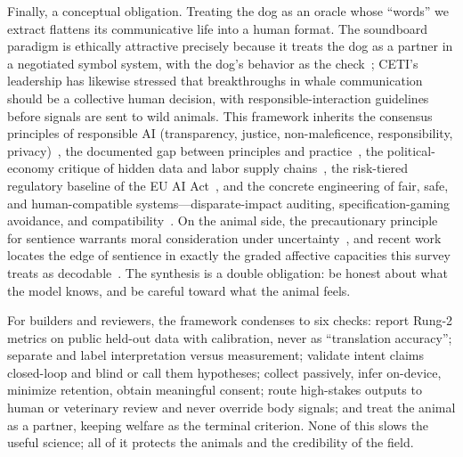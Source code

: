 Finally, a conceptual obligation. Treating the dog as an oracle whose
``words'' we extract flattens its communicative life into a human format.
The soundboard paradigm is ethically attractive precisely because it treats
the dog as a partner in a negotiated symbol system, with the dog's behavior
as the check~\cite{bastos2024plos,bastos2024scirep}; CETI's leadership has
likewise stressed that breakthroughs in whale communication should be a
collective human decision, with responsible-interaction guidelines before
signals are sent to wild animals. This framework inherits the consensus
principles of responsible AI (transparency, justice, non-maleficence,
responsibility, privacy)~\cite{jobin2019global}, the documented gap between
principles and practice~\cite{mittelstadt2019principles,floridi2018ai4people},
the political-economy critique of hidden data and labor supply
chains~\cite{crawford2021atlas}, the risk-tiered regulatory baseline of
the EU AI Act~\cite{european2024aiact}, and the concrete engineering of
fair, safe, and human-compatible systems---disparate-impact auditing,
specification-gaming avoidance, and compatibility~\cite{barocas2016bigdata,amodei2016concrete,russell2019human}. On the animal side, the precautionary
principle for sentience warrants moral consideration under
uncertainty~\cite{birch2017precaution}, and recent work locates the edge of
sentience in exactly the graded affective capacities this survey treats as
decodable~\cite{birch2024edge}. The synthesis is a double obligation: be
honest about what the model knows, and be careful toward what the animal
feels.

For builders and reviewers, the framework condenses to six checks: report
Rung-2 metrics on public held-out data with calibration, never as
``translation accuracy''; separate and label interpretation versus
measurement; validate intent claims closed-loop and blind or call them
hypotheses; collect passively, infer on-device, minimize retention, obtain
meaningful consent; route high-stakes outputs to human or veterinary review
and never override body signals; and treat the animal as a partner, keeping
welfare as the terminal criterion. None of this slows the useful science;
all of it protects the animals and the credibility of the field.
